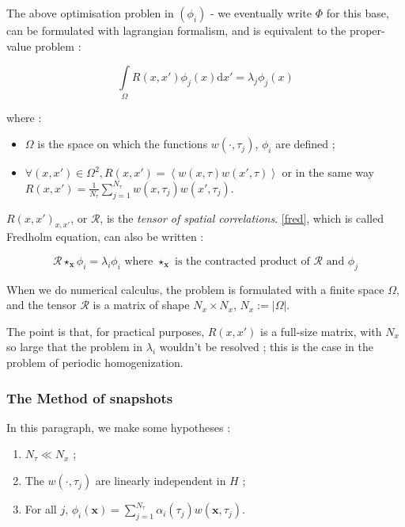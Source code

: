 \par
The above optimisation problen in $(\phi_i)$ - we eventually write $\Phi$ for this base, %
can be formulated with lagrangian formalism, and is equivalent to the proper-value problem :

\begin{equation}\label{fred}
\int\limits_{\Omega}R(x,x')\phi_j (x)\text{d}x'=\lambda_j \phi_j (x)
\end{equation}

where :
\begin{itemize}
\item $\Omega$ is the space on which the functions $w(\cdot ,\tau_j)$, $\phi_i$ are defined ;
\item $\forall (x,x')\in\Omega^2 , R(x,x')=\left\langle w(x,\tau)w(x',\tau)\right\rangle$ or in the same way $R(x,x')=\frac{1}{N_{\tau}}\sum\limits_{j=1}^{N_{\tau}} w(x,\tau_j)w(x',\tau_j)$.
\end{itemize}

$R(x,x')_{x,x'}$, or $\mathcal{R}$, is the \emph{tensor of spatial correlations}. %
\ref{fred}, which is called Fredholm equation, can also be written :

\[\mathcal{R}\star_{\mathbf{x}}\phi_i=\lambda_i\phi_i\text{ where $\star_{\mathbf{x}}$ is the contracted product of $\mathcal{R}$ and $\phi_j$}\]

\etoile
When we do numerical calculus, the problem is formulated with a finite space $\Omega$, %
and the tensor $\mathcal{R}$ is a matrix of shape $N_x\times N_x$, $N_x :=|\Omega|$.

\par
The point is that, for practical purposes, $R(x,x')$ is a full-size matrix, with $N_x$ so large that the problem in $\lambda_i$ wouldn't be resolved ; %
this is the case in the problem of periodic homogenization.

\subsubsection{The Method of snapshots}

In this paragraph, we make some hypotheses :

\begin{enumerate}[label=(Snap \arabic*)]
\item\label{hs1} $N_{\tau}\ll N_x$ ;
\item\label{hs2} The $w(\cdot , \tau_j)$ are linearly independent in $H$ ;
\item\label{hs3} For all $j$, $\phi_i(\mathbf{x})=\sum\limits_{j=1}^{N_{\tau}}\alpha_i(\tau_j) w(\mathbf{x},\tau_j)$.
\end{enumerate}

